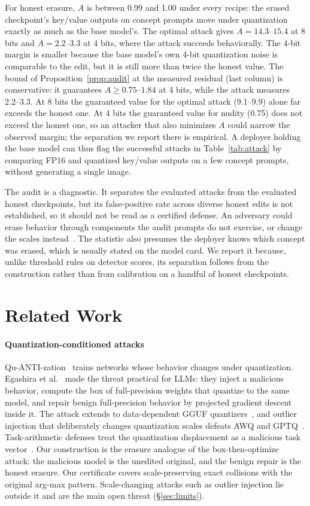 \documentclass[conference]{IEEEtran}
\begin{document}
For honest erasure, $A$ is between 0.99 and 1.00 under every recipe: the erased
checkpoint's key/value outputs on concept prompts move under quantization exactly as
much as the base model's. The optimal attack gives $A=14.3$--$15.4$ at 8 bits and
$A=2.2$--$3.3$ at 4 bits, where the attack succeeds behaviorally.
The 4-bit margin is smaller because the base model's own 4-bit quantization noise is
comparable to the edit, but it is still more than twice the honest value. The bound
of Proposition~\ref{prop:audit} at the measured residual (last column) is
conservative: it guarantees $A\ge0.75$--$1.84$ at 4 bits, while the attack measures
2.2--3.3. At 8 bits the guaranteed value for the optimal attack (9.1--9.9) alone far exceeds
the honest one. At 4 bits the guaranteed value for nudity (0.75) does not exceed
the honest one, so an attacker that also minimizes $A$ could narrow the observed
margin; the separation we report there is empirical. A deployer holding the base model can thus flag the successful attacks in
Table~\ref{tab:attack} by comparing FP16 and quantized key/value outputs on a few
concept prompts, without generating a single image.

The audit is a diagnostic. It separates the evaluated attacks from the evaluated
honest checkpoints, but its false-positive rate across diverse honest edits is not
established, so it should not be read as a certified defense. An adversary could erase
behavior through components the audit prompts do not exercise, or change the scales
instead~\cite{zhan2026}. The statistic also presumes the deployer knows which concept
was erased, which is usually stated on the model card. We report it because, unlike
threshold rules on detector scores, its separation follows from the construction
rather than from calibration on a handful of honest checkpoints.
\section{Related Work}
\label{sec:related}
\paragraph{Quantization-conditioned attacks}
Qu-ANTI-zation~\cite{hong2021} trains networks whose behavior changes under
quantization. Egashira et al.~\cite{egashira2024} made the threat practical for LLMs:
they inject a malicious behavior, compute the box of full-precision weights that
quantize to the same model, and repair benign full-precision behavior by projected
gradient descent inside it. The attack extends to data-dependent GGUF
quantizers~\cite{egashira2025}, and outlier injection that deliberately changes
quantization scales defeats AWQ and GPTQ~\cite{zhan2026}. Task-arithmetic
defenses treat the quantization displacement as a malicious task
vector~\cite{yang2026qvec}. Our construction is the erasure analogue of the
box-then-optimize attack: the malicious model is the unedited original, and the benign
repair is the honest erasure. Our certificate covers scale-preserving exact collisions
with the original arg-max pattern. Scale-changing attacks such as outlier injection lie outside it and are
the main open threat (\S\ref{sec:limits}).
\end{document}
